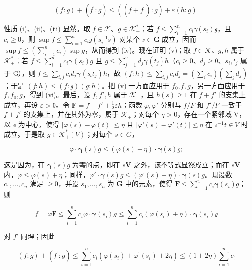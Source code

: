 \[
(f: g) + (f ^ {\prime}: g) \leqslant ((f + f ^ {\prime}): g) + \varepsilon (h: g).
\]

性质 (i)、(ii)、(iii) 显然。取 \(f \in \mathcal{K}\)、\(g \in \mathcal{K}_+^*\)；若 \(f \leqslant \sum_{i=1}^{n} c_i \gamma(s_i)g\)，且 \(c_i \geqslant 0\)，则 \(\sup f \leqslant \sum_{i=1}^{n} c_i g(s_i^{-1}s)\) 对某个 \(s \in \mathbf{G}\) 成立，因而 \(\sup f \leqslant \left( \sum_{i=1}^{n} c_i \right) \sup g\)，从而得到 (iv)。现在证明 (v)；取 \(f \in \mathcal{K}\)、\(g, h\) 属于 \(\mathcal{K}_+^*\)；若 \(f \leqslant \sum_{i=1}^{n} c_i \boldsymbol{\gamma}(s_i) g\) 且 \(g \leqslant \sum_{j=1}^{p} d_j \boldsymbol{\gamma}(t_j) h\)（\(c_i \geqslant 0\)、\(d_j \geqslant 0\)、\(s_i, t_j\) 属于 G），则 \(f \leqslant \sum_{i,j} c_i d_j \boldsymbol{\gamma}(s_i t_j) h\)，故 \((f: h) \leqslant \sum_{i,j} c_i d_j = \left( \sum_{i} c_i \right) \left( \sum_{j} d_j \right)\)；于是 \((f: h) \leqslant (f: g)(g: h)\)。把 (v) 一方面应用于 \(f_0, f, g\)，另一方面应用于 \(f, f_0, g\)，得到 (vi)。最后，设 \(f, f', h\) 属于 \(\mathcal{K}_+\)，且 \(h(s) \geqslant 1\) 在 \(f + f'\) 的支集上成立，再设 \(\varepsilon > 0\)。令 \(\mathbf{F} = f + f' + \frac{1}{2} \varepsilon h\)；函数 \(\varphi, \varphi'\) 分别与 \(f / F\) 和 \(f'/F\) 一致于 \(f + f'\) 的支集上，并在其外为零，属于 \(\mathcal{K}_+\)；对每个 \(\eta > 0\)，存在一个紧邻域 V，以 \(e\) 为中心，使得 \(|\varphi(s) - \varphi(t)| \leqslant \eta\) 且 \(|\varphi'(s) - \varphi'(t)| \leqslant \eta\) 在 \(s^{-1} t \in V\) 时成立。于是取 \(g \in \mathcal{K}_+^*(V)\)；对每个 \(s \in G\)，

\[
\varphi \cdot \boldsymbol {\gamma} (s) g \leqslant (\varphi (s) + \eta) \cdot \boldsymbol {\gamma} (s) g;
\]

这是因为，在 \(\pmb{\gamma}(s)g\) 为零的点，即在 \(s\mathbf{V}\) 之外，该不等式显然成立；而在 \(s\mathbf{V}\) 内，\(\varphi \leqslant \varphi(s) + \eta\)；同样，\(\varphi' \cdot \pmb{\gamma}(s)g \leqslant (\varphi'(s) + \eta) \cdot \pmb{\gamma}(s)g\)。现设数 \(c_1, \ldots, c_n\) 满足 \(\geqslant 0\)，并设 \(s_1, \ldots, s_n\) 为 \(\mathbf{G}\) 中的元素，使得 \(\mathbf{F} \leqslant \sum_{i=1}^{n} c_i \pmb{\gamma}(s_i)g\)；则

\[
f = \varphi \mathrm{F} \leqslant \sum_ {i = 1} ^ {n} c _ {i} \varphi \cdot \boldsymbol {\gamma} (s _ {i}) g \leqslant \sum_ {i = 1} ^ {n} c _ {i} (\varphi (s _ {i}) + \eta) \cdot \boldsymbol {\gamma} (s _ {i}) g
\]

对 \(f'\) 同理；因此

\[
(f: g) + (f ^ {\prime}: g) \leqslant \sum_ {i = 1} ^ {n} c _ {i} (\varphi (s _ {i}) + \varphi^ {\prime} (s _ {i}) + 2 \eta) \leqslant (1 + 2 \eta) \sum_ {i = 1} ^ {n} c _ {i}
\]

